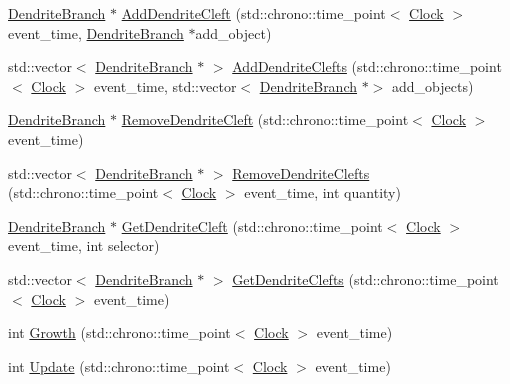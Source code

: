 \begin{DoxyCompactItemize}
\mbox{\hyperlink{classDendriteBranch}{Dendrite\+Branch}} $\ast$ \mbox{\hyperlink{classDendriteBranch_a060f0c55b2e6cb65b68e160df0bbf563}{Add\+Dendrite\+Cleft}} (std\+::chrono\+::time\+\_\+point$<$ \mbox{\hyperlink{universe_8h_a0ef8d951d1ca5ab3cfaf7ab4c7a6fd80}{Clock}} $>$ event\+\_\+time, \mbox{\hyperlink{classDendriteBranch}{Dendrite\+Branch}} $\ast$add\+\_\+object)
\item 
std\+::vector$<$ \mbox{\hyperlink{classDendriteBranch}{Dendrite\+Branch}} $\ast$ $>$ \mbox{\hyperlink{classDendriteBranch_a2ddeff41db805e414c994ac169cbcf4b}{Add\+Dendrite\+Clefts}} (std\+::chrono\+::time\+\_\+point$<$ \mbox{\hyperlink{universe_8h_a0ef8d951d1ca5ab3cfaf7ab4c7a6fd80}{Clock}} $>$ event\+\_\+time, std\+::vector$<$ \mbox{\hyperlink{classDendriteBranch}{Dendrite\+Branch}} $\ast$$>$ add\+\_\+objects)
\item 
\mbox{\hyperlink{classDendriteBranch}{Dendrite\+Branch}} $\ast$ \mbox{\hyperlink{classDendriteBranch_afaca221cb4bba98e56f11b0f9e6370b5}{Remove\+Dendrite\+Cleft}} (std\+::chrono\+::time\+\_\+point$<$ \mbox{\hyperlink{universe_8h_a0ef8d951d1ca5ab3cfaf7ab4c7a6fd80}{Clock}} $>$ event\+\_\+time)
\item 
std\+::vector$<$ \mbox{\hyperlink{classDendriteBranch}{Dendrite\+Branch}} $\ast$ $>$ \mbox{\hyperlink{classDendriteBranch_acd54003e5acb9abda7d7a42f248c14b0}{Remove\+Dendrite\+Clefts}} (std\+::chrono\+::time\+\_\+point$<$ \mbox{\hyperlink{universe_8h_a0ef8d951d1ca5ab3cfaf7ab4c7a6fd80}{Clock}} $>$ event\+\_\+time, int quantity)
\item 
\mbox{\hyperlink{classDendriteBranch}{Dendrite\+Branch}} $\ast$ \mbox{\hyperlink{classDendriteBranch_a11f25ffce77011afad909acb593d2e42}{Get\+Dendrite\+Cleft}} (std\+::chrono\+::time\+\_\+point$<$ \mbox{\hyperlink{universe_8h_a0ef8d951d1ca5ab3cfaf7ab4c7a6fd80}{Clock}} $>$ event\+\_\+time, int selector)
\item 
std\+::vector$<$ \mbox{\hyperlink{classDendriteBranch}{Dendrite\+Branch}} $\ast$ $>$ \mbox{\hyperlink{classDendriteBranch_a2be44a81b4b5213947e9545400a0453c}{Get\+Dendrite\+Clefts}} (std\+::chrono\+::time\+\_\+point$<$ \mbox{\hyperlink{universe_8h_a0ef8d951d1ca5ab3cfaf7ab4c7a6fd80}{Clock}} $>$ event\+\_\+time)
\item 
int \mbox{\hyperlink{classDendriteBranch_a4b950ef8a0856a11240d353bcfd1fba4}{Growth}} (std\+::chrono\+::time\+\_\+point$<$ \mbox{\hyperlink{universe_8h_a0ef8d951d1ca5ab3cfaf7ab4c7a6fd80}{Clock}} $>$ event\+\_\+time)
\item 
int \mbox{\hyperlink{classDendriteBranch_a8540dfafeb5bd45f782ab31b8231b10f}{Update}} (std\+::chrono\+::time\+\_\+point$<$ \mbox{\hyperlink{universe_8h_a0ef8d951d1ca5ab3cfaf7ab4c7a6fd80}{Clock}} $>$ event\+\_\+time)
\end{DoxyCompactItemize}
